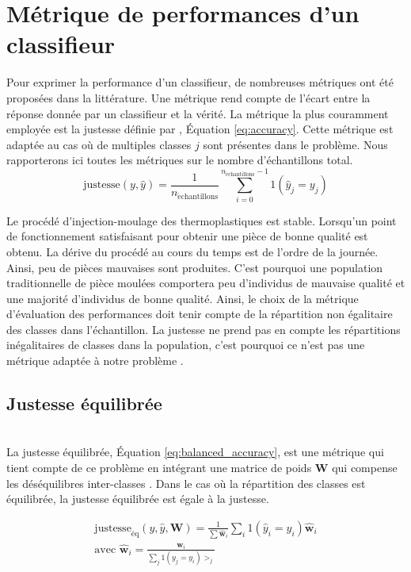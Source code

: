 \section{Métrique de performances d'un classifieur}
Pour exprimer la performance d'un classifieur, de nombreuses métriques ont été proposées dans la littérature.
Une métrique rend compte de l'écart entre la réponse donnée par un classifieur et la vérité.
La métrique la plus couramment employée est la justesse définie par \citeauthor{metz_basic_1978} \cite{metz_basic_1978}, Équation \ref{eq:accuracy}.
Cette métrique est adaptée au cas où de multiples classes $j$ sont présentes dans le problème.
Nous rapporterons ici toutes les métriques sur le nombre d'échantillons total.
\begin{equation} \label{eq:accuracy}
\text{justesse}(y, \hat{y})=\frac{1}{n_{\mathrm{\acute{e}chantillons}}} \sum_{i=0}^{n_{\mathrm{\acute{e}chantillons}}-1} 1\left(\hat{y}_{j}=y_{j}\right)
\end{equation}

Le procédé d'injection-moulage des thermoplastiques est stable.
Lorsqu'un point de fonctionnement satisfaisant pour obtenir une pièce de bonne qualité est obtenu.
La dérive du procédé au cours du temps est de l'ordre de la journée.
Ainsi, peu de pièces mauvaises sont produites.
C'est pourquoi une population traditionnelle de pièce moulées comportera peu d'individus de mauvaise qualité et une majorité d'individus de bonne qualité.
Ainsi, le choix de la métrique d'évaluation des performances doit tenir compte de la répartition non égalitaire des classes dans l'échantillon.
La justesse ne prend pas en compte les répartitions inégalitaires de classes dans la population, c'est pourquoi ce n'est pas une métrique adaptée à notre problème \cite{japkowicz_class_2002}.

\subsection{Justesse équilibrée}\mbox{} \\
La justesse équilibrée, Équation \ref{eq:balanced_accuracy}, est une métrique qui tient compte de ce problème en intégrant une matrice de poids $\mathbf{W}$ qui compense les déséquilibres inter-classes \cite{brodersen_balanced_2010, mosley_balanced_2013}.
Dans le cas où la répartition des classes est équilibrée, la justesse équilibrée est égale à la justesse.

\begin{equation} \label{eq:balanced_accuracy}
\begin{split}
\text{justesse}_{\text{éq}}(y, \hat{y}, \mathbf{W})=\frac{1}{\sum \hat{\mathbf{w}}_{i}} \sum_{i} 1\left(\hat{y}_{i}=y_{i}\right) \hat{\mathbf{w}}_{i}
\\
\text{avec } \hat{\mathbf{w}}_{i}=\frac{\mathbf{w}_{i}}{\sum_{j} 1\left(y_{j}=y_{i}\right) >_{j}}
\end{split}
\end{equation}


